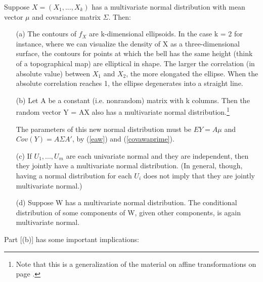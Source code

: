 \begin{theorem}
\label{mvnormtheorem}

Suppose $X = (X_1,...,X_k)$ has a multivariate normal distribution with
mean vector $\mu$ and covariance matrix $\Sigma$.  Then:

\begin{itemize}

\item [(a)] The contours of $f_X$ are k-dimensional ellipsoids.  In the
case k = 2 for instance, where we can visualize the density of X as a
three-dimensional surface, the contours for points at which the bell has
the same height (think of a topographical map) are elliptical in shape.
The larger the correlation (in absolute value) between $X_1$ and $X_2$,
the more elongated the ellipse.  When the absolute correlation reaches
1, the ellipse degenerates into a straight line.

\item [(b)] Let A be a constant (i.e. nonrandom) matrix with k columns.
Then the random vector Y = AX also has a multivariate normal
distribution.\footnote{Note that this is a generalization of the
material on affine transformations on page \pageref{affine}.} 

The parameters of this new normal distribution must be $EY = A \mu$ 
and $Cov(Y) = A \Sigma A'$,  by (\ref{eaw}) and (\ref{covawaprime}).
   
\item [(c)] If $U_1,...,U_m$ are each univariate normal and they are
independent, then they jointly have a multivariate normal distribution.
(In general, though, having a normal distribution for each $U_i$ does
not imply that they are jointly multivariate normal.)  

\item [(d)] Suppose W has a multivariate normal distribution.  The
conditional distribution of some components of W, given other
components, is again multivariate normal.

\end{itemize}

\end{theorem}

Part [(b)] has some important implications:

